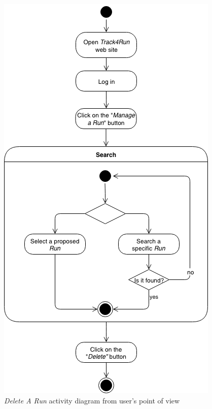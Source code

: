 \begin{figure}[H]
\begin{center}
  \includegraphics[height=0.6\paperheight]{img/activity/DeleteRun.png}
  \hspace{0.05\linewidth}
  \centering
  \caption{\textit{Delete A Run} activity diagram from user's point of view}
  \label{img:deleteRunActivityDiagram}
\end{center}
\end{figure}

